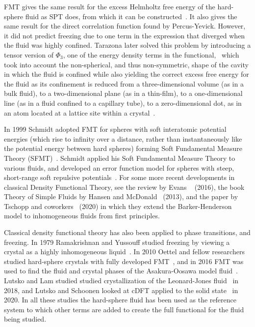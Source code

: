 \documentclass[double,12pt]{beavtex}
\begin{document}
FMT gives the same result for the excess Helmholtz free energy of the 
hard-sphere fluid as SPT does, from which it can be 
constructed~\cite{rosenfeld1989,Hansen,santos2012phi3}. It also gives the same 
result for the direct correlation function found by Percus-Yevick. 
However, it did not predict freezing due to one term in the expression that
diverged when the fluid was highly confined.  
Tarazona later solved this problem by introducing a tensor version of $\Phi_3$,
one of the energy density terms 
in the functional,~\cite{tarazonaphi3, santos2012phi3} 
which took into account the non-spherical, and thus 
non-symmetric, shape of the cavity in which the fluid is confined 
while also yielding the correct excess free energy for the fluid as its 
confinement is reduced from a three-dimensional volume (as in a bulk fluid), 
to a two-dimensional plane (as in a thin-film), to a one-dimensional 
line (as in a fluid confined to a capillary tube), to a zero-dimensional 
dot, as in an atom located at a lattice site within a crystal~\cite{rothreview}. 

In 1999 Schmidt adopted FMT for spheres with soft 
interatomic potential energies
(which rise to infinity over a distance, rather than instantaneously 
like the potential energy between hard spheres)
forming Soft Fundamental Measure Theory (SFMT)~\cite{schmidt1999density}. 
Schmidt applied his Soft Fundamental Measure Theory to various fluids, 
and developed 
an error function model 
for spheres with steep, short-range soft repulsive 
potentials~\cite{schmidt2000fluid}.
For some more recent developments in classical Density Functional Theory, 
see the review by Evans ~\cite{evansreview} (2016), the book 
Theory of Simple Fluids by Hansen and McDonald~\cite{Hansen} (2013), 
and the paper by Tschopp and coworkers~\cite{BHextended} (2020) in which 
they extend the Barker-Henderson model to inhomogeneous 
fluids from first principles.

Classical density functional theory has also been applied 
to phase transitions, and freezing. In 1979 Ramakrishnan and Yussouff studied 
freezing by viewing a 
crystal as a highly inhomogeneous liquid~\cite{ramakrishnanandyussouff}. 
In 2010 Oettel and fellow researchers studied hard-sphere crystals with 
fully developed FMT~\cite{Oettel2010}, and 
in 2016 FMT was used to find the fluid and crystal phases of the 
Asakura-Oosawa model fluid~\cite{asakuraoosawa}. 
Lutsko and Lam studied studied crystallization of the Leonard-Jones 
fluid~\cite{lutsko} in 2018, and Lutsko and Schoonen looked at cDFT applied 
to the solid state~\cite{lutskoschoonen2020} in 2020.
In all these studies the hard-sphere fluid has been used as the reference 
system to which other terms are added to create 
the full functional for the fluid being studied.
\end{document}
